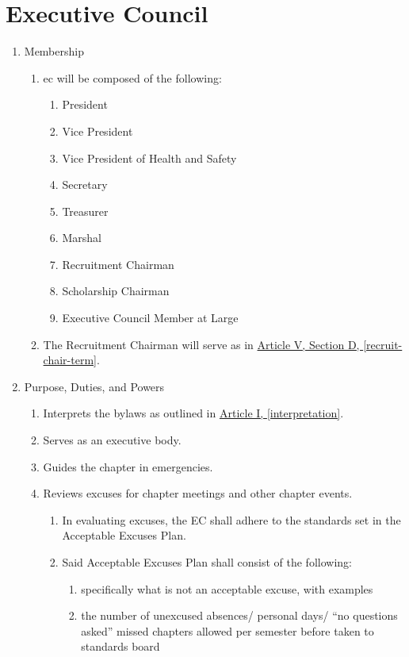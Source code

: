 \section{Executive Council}
	\begin{enumerate}
		\item Membership
			\begin{enumerate}
				\item \Gls{ec} will be composed of the following:
					\begin{enumerate}
						\item President
						\item Vice President
						\item Vice President of Health and Safety
						\item Secretary
						\item Treasurer
						\item Marshal
						\item Recruitment Chairman
                        \item Scholarship Chairman
						\item Executive Council Member at Large
					\end{enumerate}
				\item The Recruitment Chairman will serve as in \hyperref[recruit-chair-term]{Article V, Section D, \autoref*{recruit-chair-term}}.

			\end{enumerate}

		\item Purpose, Duties, and Powers
			\begin{enumerate}
				\item Interprets the bylaws as outlined in \hyperref[interpretation]{Article I, \autoref*{interpretation}}. 
				\item Serves as an executive body.
				\item Guides the chapter in emergencies.
				\item Reviews excuses for chapter meetings and other chapter events.
					\begin{enumerate}
					\item In evaluating excuses, the EC shall adhere to the standards set in the
					Acceptable Excuses Plan.
					\item Said Acceptable Excuses Plan shall consist of the following:
						\begin{enumerate} specifically what is an acceptable excuse, with examples
						\item specifically what is not an acceptable excuse, with examples
						\item the number of unexcused absences/ personal days/ “no questions
						asked” missed chapters allowed per semester before taken to
						standards board
						\end{enumerate}
                        

\end{enumerate}
\end{enumerate}
\end{enumerate}
